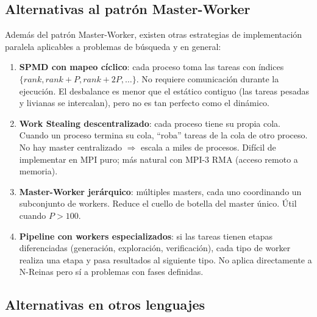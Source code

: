 \documentclass[12pt,a4paper]{article}
\begin{document}
\subsection{Alternativas al patrón Master-Worker}

Además del patrón Master-Worker, existen otras estrategias de implementación
paralela aplicables a problemas de búsqueda y en general:

\begin{enumerate}[leftmargin=*]
  \item \textbf{SPMD con mapeo cíclico}: cada proceso toma las tareas con índices
    $\{rank, rank+P, rank+2P, \ldots\}$. No requiere comunicación durante la
    ejecución. El desbalance es menor que el estático contiguo (las tareas pesadas
    y livianas se intercalan), pero no es tan perfecto como el dinámico.

  \item \textbf{Work Stealing descentralizado}: cada proceso tiene su propia cola.
    Cuando un proceso termina su cola, ``roba'' tareas de la cola de otro proceso.
    No hay master centralizado $\Rightarrow$ escala a miles de procesos. Difícil
    de implementar en MPI puro; más natural con MPI-3 RMA (acceso remoto a memoria).

  \item \textbf{Master-Worker jerárquico}: múltiples masters, cada uno coordinando
    un subconjunto de workers. Reduce el cuello de botella del master único. Útil
    cuando $P > 100$.

  \item \textbf{Pipeline con workers especializados}: si las tareas tienen etapas
    diferenciadas (generación, exploración, verificación), cada tipo de worker
    realiza una etapa y pasa resultados al siguiente tipo. No aplica directamente
    a N-Reinas pero sí a problemas con fases definidas.
\end{enumerate}

\subsection{Alternativas en otros lenguajes}
\end{document}
